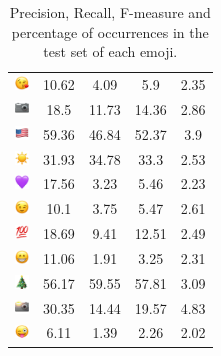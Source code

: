 \documentclass{article}
\begin{document}
\begin{table}
\begin{tabular}{|c|ccc|c|}
\includegraphics[height=0.37cm,width=0.37cm]{img/face_blowing_a_kiss.png} & 10.62 & 4.09 & 5.9 & 2.35\\ 
\includegraphics[height=0.37cm,width=0.37cm]{img/camera.png} & 18.5 & 11.73 & 14.36 & 2.86\\ 
\includegraphics[height=0.37cm,width=0.37cm]{img/United_States.png} & 59.36 & 46.84 & 52.37 & 3.9\\ 
\includegraphics[height=0.37cm,width=0.37cm]{img/sun.png} & 31.93 & 34.78 & 33.3 & 2.53\\ 
\includegraphics[height=0.37cm,width=0.37cm]{img/purple_heart.png} & 17.56 & 3.23 & 5.46 & 2.23\\ 
\includegraphics[height=0.37cm,width=0.37cm]{img/winking_face.png} & 10.1 & 3.75 & 5.47 & 2.61\\ 
\includegraphics[height=0.37cm,width=0.37cm]{img/hundred_points.png} & 18.69 & 9.41 & 12.51 & 2.49\\ 
\includegraphics[height=0.37cm,width=0.37cm]{img/beaming_face_with_smiling_eyes.png} & 11.06 & 1.91 & 3.25 & 2.31\\ 
\includegraphics[height=0.37cm,width=0.37cm]{img/Christmas_tree.png} & 56.17 & 59.55 & 57.81 & 3.09\\ 
\includegraphics[height=0.37cm,width=0.37cm]{img/camera_with_flash.png} & 30.35 & 14.44 & 19.57 & 4.83\\ 
\includegraphics[height=0.37cm,width=0.37cm]{img/winking_face_with_tongue.png} & 6.11 & 1.39 & 2.26 & 2.02\\ 

\hline
\end{tabular}
\caption{\label{table:emoji_detailed} Precision, Recall, F-measure and percentage of occurrences in the test set of each emoji.}
\end{table}
\end{document}
